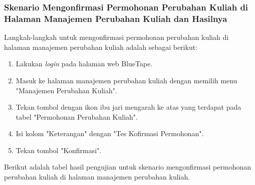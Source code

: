\subsubsection{Skenario Mengonfirmasi Permohonan Perubahan Kuliah di Halaman Manajemen Perubahan Kuliah dan Hasilnya}
\label{subsubsec:skenario_mengonfirmasi_permohonan_perubahan_kuliah_di_halaman_manajemen_perubahan_kuliah}
Langkah-langkah untuk mengonfirmasi permohonan perubahan kuliah di halaman manajemen perubahan kuliah adalah sebagai berikut:

\begin{enumerate}
    \item Lakukan \textit{login} pada halaman web BlueTape.
    \item Masuk ke halaman manajemen perubahan kuliah dengan memilih menu "Manajemen Perubahan Kuliah".
    \item Tekan tombol dengan ikon ibu jari mengarah ke atas yang terdapat pada tabel "Permohonan Perubahan Kuliah".
    \item Isi kolom "Keterangan" dengan "Tes Kofirmasi Permohonan".
    \item Tekan tombol "Konfirmasi".
\end{enumerate}

Berikut adalah tabel hasil pengujian untuk skenario mengonfirmasi permohonan perubahan kuliah di halaman manajemen perubahan kuliah.

